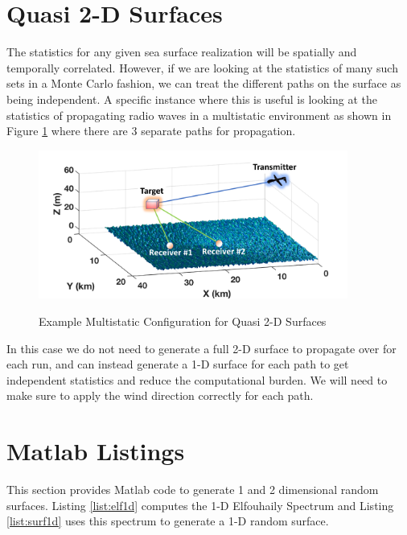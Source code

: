 \section {Quasi 2-D Surfaces}
The statistics for any given sea surface realization will be spatially and temporally correlated. However, if we are looking at the statistics of many such sets in a Monte Carlo fashion, we can treat the different paths on the surface as being independent. A specific instance where this is useful is looking at the statistics of propagating radio waves in a multistatic environment as shown in Figure \ref{os_fig:16} where there are 3 separate paths for propagation.

\begin{figure}[ht]
  \begin{center}
\includegraphics[width=4in]{../media/multistatic/ms_rf_concept2.png}
  \end{center}
  \renewcommand{\baselinestretch}{1} \small\normalsize
  \begin{quote}
    \caption[Example Multistatic Configuration for Quasi 2-D Surfaces]{Example Multistatic Configuration for Quasi 2-D Surfaces\label{os_fig:16}}
  \end{quote}
\end{figure}
\renewcommand{\baselinestretch}{2} \small\normalsize

In this case we do not need to generate a full 2-D surface to propagate over for each run, and can instead generate a 1-D surface for each path to get independent statistics and reduce the computational burden. We will need to make sure to apply the wind direction correctly for each path.

\section {Matlab Listings}
This section provides Matlab code to generate 1 and 2 dimensional random surfaces. Listing \ref{list:elf1d} computes the 1-D Elfouhaily Spectrum and Listing \ref{list:surf1d} uses this spectrum to generate a 1-D random surface.

